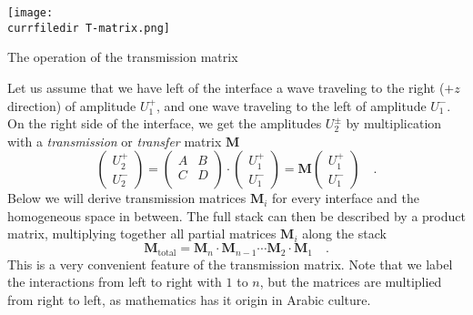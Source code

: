 \begin{marginfigure}
\texttt{[image: \\currfiledir T-matrix.png]}

\caption{The operation of the transmission matrix
\label{fig:6_T_matrix}}
\end{marginfigure}

Let us assume that we have left of the interface a wave traveling to the right ($+z$ direction) of amplitude $U_1^+$, and one wave traveling to the left of amplitude $U_1^-$. On the right side of the interface, we get the amplitudes $U_2^\pm$ by multiplication with a \emph{transmission} or \emph{transfer} matrix $\mathbf{M}$
\begin{equation}
\begin{pmatrix}
U_2^+ \\ U_2^-
\end{pmatrix}
= 
\begin{pmatrix}
A & B \\ C & D \\
\end{pmatrix}
\cdot
\begin{pmatrix}
U_1^+ \\ U_1^-
\end{pmatrix}
%
= \mathbf{M}
\begin{pmatrix}
U_1^+ \\ U_1^-
\end{pmatrix} \quad . \label{eq:6_def_T_matrix}
\end{equation}
Below we will derive transmission matrices $\mathbf{M}_i$ for every interface and the homogeneous space in between. The full stack can then be described by a product matrix, multiplying together all partial matrices $\mathbf{M}_i$ along the stack
\begin{equation}
\mathbf{M}_\text{total} = \mathbf{M}_n \cdot  \mathbf{M}_{n-1} \cdots\mathbf{M}_2 \cdot  \mathbf{M}_{1} \quad . 
\end{equation}
This is a very convenient feature of the transmission matrix.
Note that we label the interactions from left to right with $1$ to $n$, but the matrices are multiplied from right to left, as mathematics has it origin in Arabic culture.



